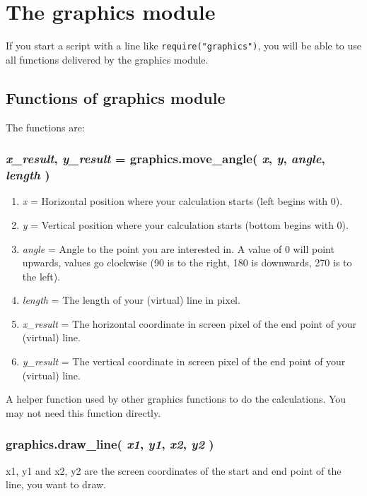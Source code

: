 \documentclass[11pt,parskip=half,a4paper]{scrartcl}
\begin{document}
\newpage
\section{The graphics module}

If you start a script with a line like \verb|require("graphics")|, you will be able to use all functions delivered by the graphics module. 

\subsection{Functions of graphics module}

The functions are:

\subsubsection{\emph{x\_result}, \emph{y\_result} = graphics.move\_angle( \emph{x}, \emph{y}, \emph{angle}, \emph{length} )}

\begin{enumerate}
	\item \emph{x} = Horizontal position where your calculation starts (left begins with 0).
	\item \emph{y} = Vertical position where your calculation starts (bottom begins with 0).
	\item \emph{angle} = Angle to the point you are interested in. A value of 0 will point upwards, values go clockwise (90 is to the right, 180 is downwards, 270 is to the left).
	\item \emph{length} = The length of your (virtual) line in pixel.
	\item \emph{x\_result} = The horizontal coordinate in screen pixel of the end point of your (virtual) line.
	\item \emph{y\_result} = The vertical coordinate in screen pixel of the end point of your (virtual) line.
\end{enumerate}

A helper function used by other graphics functions to do the calculations. You may not need this function directly.

\subsubsection{graphics.draw\_line( \emph{x1}, \emph{y1}, \emph{x2}, \emph{y2} )}

x1, y1 and x2, y2 are the screen coordinates of the start and end point of the line, you want to draw.
\end{document}
